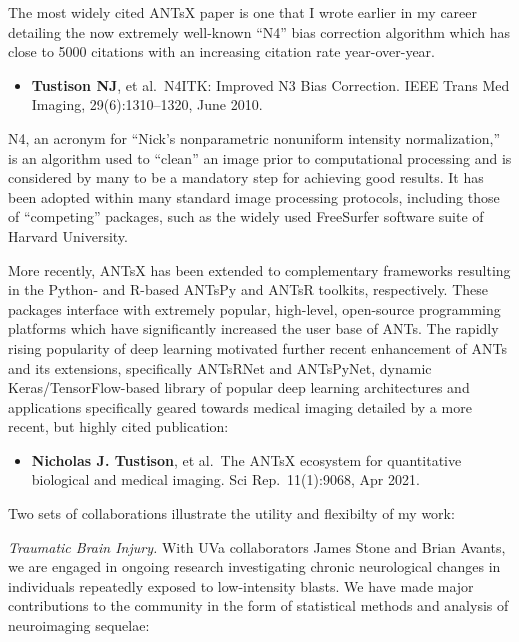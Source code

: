 \documentclass[
  11pt,
]{article}
\providecommand{\tightlist}{%
  \setlength{\itemsep}{0pt}\setlength{\parskip}{0pt}}
\begin{document}
The most widely cited ANTsX paper is one that I wrote earlier in my
career detailing the now extremely well-known ``N4'' bias correction
algorithm which has close to 5000 citations with an increasing citation
rate year-over-year.

\begin{itemize}
\tightlist
\item
  \textbf{Tustison NJ}, et al.~N4ITK: Improved N3 Bias Correction. IEEE
  Trans Med Imaging, 29(6):1310--1320, June 2010.
\end{itemize}

N4, an acronym for ``Nick's nonparametric nonuniform intensity
normalization,'' is an algorithm used to ``clean'' an image prior to
computational processing and is considered by many to be a mandatory
step for achieving good results. It has been adopted within many
standard image processing protocols, including those of ``competing''
packages, such as the widely used FreeSurfer software suite of Harvard
University.

More recently, ANTsX has been extended to complementary frameworks
resulting in the Python- and R-based ANTsPy and ANTsR toolkits,
respectively. These packages interface with extremely popular,
high-level, open-source programming platforms which have significantly
increased the user base of ANTs. The rapidly rising popularity of deep
learning motivated further recent enhancement of ANTs and its
extensions, specifically ANTsRNet and ANTsPyNet, dynamic
Keras/TensorFlow-based library of popular deep learning architectures
and applications specifically geared towards medical imaging detailed by
a more recent, but highly cited publication:

\begin{itemize}
\tightlist
\item
  \textbf{Nicholas J. Tustison}, et al.~The ANTsX ecosystem for
  quantitative biological and medical imaging. Sci Rep.~11(1):9068, Apr
  2021.
\end{itemize}

Two sets of collaborations illustrate the utility and flexibilty of my
work:

\emph{Traumatic Brain Injury.} With UVa collaborators James Stone and
Brian Avants, we are engaged in ongoing research investigating chronic
neurological changes in individuals repeatedly exposed to low-intensity
blasts. We have made major contributions to the community in the form of
statistical methods and analysis of neuroimaging sequelae:
\end{document}
